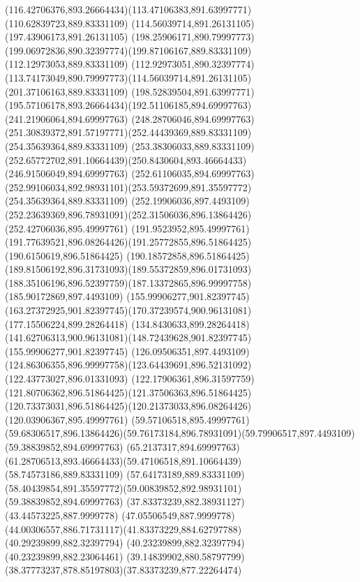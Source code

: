 {{\curveto(116.42706376,893.26664434)(113.47106383,891.63997771)(110.62839723,889.83331109)
\moveto(114.56039714,891.26131105)
\lineto(197.43906173,891.26131105)
\curveto(198.25906171,890.79997773)(199.06972836,890.32397774)(199.87106167,889.83331109)
\lineto(112.12973053,889.83331109)
\curveto(112.92973051,890.32397774)(113.74173049,890.79997773)(114.56039714,891.26131105)
\moveto(201.37106163,889.83331109)
\curveto(198.52839504,891.63997771)(195.57106178,893.26664434)(192.51106185,894.69997763)
\lineto(241.21906064,894.69997763)
\curveto(248.28706046,894.69997763)(251.30839372,891.57197771)(252.44439369,889.83331109)
\closepath
\moveto(254.35639364,889.83331109)
\lineto(253.38306033,889.83331109)
\curveto(252.65772702,891.10664439)(250.8430604,893.46664433)(246.91506049,894.69997763)
\lineto(252.61106035,894.69997763)
\curveto(252.99106034,892.98931101)(253.59372699,891.35597772)(254.35639364,889.83331109)
\moveto(252.19906036,897.4493109)
\curveto(252.23639369,896.78931091)(252.31506036,896.13864426)(252.42706036,895.49997761)
\lineto(191.9523952,895.49997761)
\curveto(191.77639521,896.08264426)(191.25772855,896.51864425)(190.6150619,896.51864425)
\curveto(190.18572858,896.51864425)(189.81506192,896.31731093)(189.55372859,896.01731093)
\curveto(188.35106196,896.52397759)(187.13372865,896.99997758)(185.90172869,897.4493109)
\closepath
\moveto(155.99906277,901.82397745)
\curveto(163.27372925,901.82397745)(170.37239574,900.96131081)(177.15506224,899.28264418)
\lineto(134.8430633,899.28264418)
\curveto(141.62706313,900.96131081)(148.72439628,901.82397745)(155.99906277,901.82397745)
\moveto(126.09506351,897.4493109)
\curveto(124.86306355,896.99997758)(123.64439691,896.52131092)(122.43773027,896.01331093)
\curveto(122.17906361,896.31597759)(121.80706362,896.51864425)(121.37506363,896.51864425)
\curveto(120.73373031,896.51864425)(120.21373033,896.08264426)(120.03906367,895.49997761)
\lineto(59.57106518,895.49997761)
\curveto(59.68306517,896.13864426)(59.76173184,896.78931091)(59.79906517,897.4493109)
\closepath
\moveto(59.38839852,894.69997763)
\lineto(65.2137317,894.69997763)
\curveto(61.28706513,893.46664433)(59.47106518,891.10664439)(58.74573186,889.83331109)
\lineto(57.64173189,889.83331109)
\curveto(58.40439854,891.35597772)(59.00839852,892.98931101)(59.38839852,894.69997763)
\moveto(37.83373239,882.38931127)
\lineto(43.44573225,887.9999778)
\lineto(47.05506549,887.9999778)
\curveto(44.00306557,886.71731117)(41.83373229,884.62797788)(40.29239899,882.32397794)
\lineto(40.23239899,882.32397794)
\lineto(40.23239899,882.23064461)
\curveto(39.14839902,880.58797799)(38.37773237,878.85197803)(37.83373239,877.22264474)
}}
